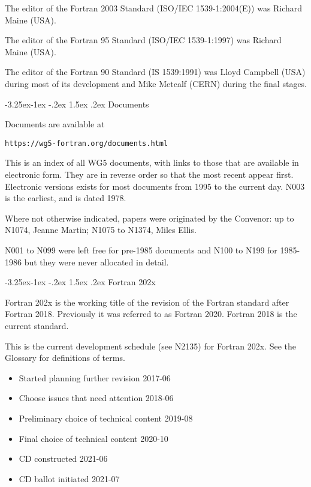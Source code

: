 \documentclass[10pt,letterpaper,twoside]{article}
\makeatletter
\renewcommand\subsection{\@startsection{subsection}{2}{\z@}%
                                     {-3.25ex\@plus -1ex \@minus -.2ex}%
                                     {1.5ex \@plus .2ex}%
                                     {\sf\normalsize\bfseries}}
\makeatother
\begin{document}
The editor of the Fortran 2003 Standard (ISO/IEC 1539-1:2004(E)) was 
Richard Maine (USA).

The editor of the Fortran 95 Standard (ISO/IEC 1539-1:1997) was Richard 
Maine (USA).

The editor of the Fortran 90 Standard (IS 1539:1991) was Lloyd Campbell 
(USA) during most of its development and Mike Metcalf (CERN) during 
the final stages.


\subsection{Documents}

Documents are available at

\begin{verbatim}
https://wg5-fortran.org/documents.html
\end{verbatim}

This is an index of all WG5 documents, with links to those that are 
available in electronic form. They are in reverse order so that the 
most recent appear first. Electronic versions exists for most documents from 1995 to the current day. N003 is the earliest, and is dated 1978.

Where not otherwise indicated, papers were originated by the Convenor: 
up to N1074, Jeanne Martin; N1075 to N1374, Miles Ellis.

N001 to N099 were left free for pre-1985 documents and N100 to N199 
for 1985-1986 but they were never allocated in detail.

\subsection{Fortran 202x}

Fortran 202x is the working title of the revision of the Fortran standard 
after Fortran 2018. Previously it was referred to as Fortran 2020. 
Fortran 2018 is the current standard. 

This is the current development schedule (see N2135) for Fortran 202x. 
See the Glossary for definitions of terms.

\begin{itemize}

\item{Started planning further revision 2017-06}

\item{Choose issues that need attention 2018-06}

\item{Preliminary choice of technical content 2019-08}

\item{Final choice of technical content 2020-10}

\item{CD constructed 2021-06}

\item{CD ballot initiated 2021-07 }

\end{itemize}
\end{document}
